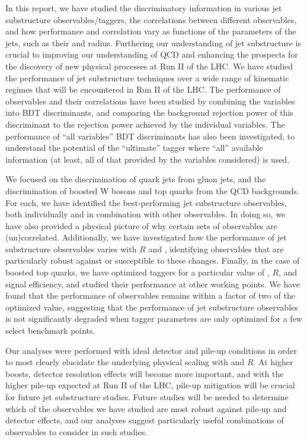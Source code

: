 In this report, we have studied the discriminatory information in various jet substructure observables/taggers, the correlations between different observables, and how performance and correlation vary as functions of the parameters of the jets, such as their \pt and radius. Furthering our understanding of jet substructure is crucial to improving our understanding of QCD and enhancing the prospects for the discovery of new physical processes at Run II of the LHC. We have studied the performance of jet substructure techniques over a wide range of kinematic regimes that will be encountered in Run II of the LHC. The performance of observables and their correlations have been studied by combining the variables into BDT discriminants, and comparing the background rejection power of this discriminant to the rejection power achieved by the individual variables. The performance of ``all variables'' BDT discriminants has also been investigated, to understand the potential of the ``ultimate'' tagger where ``all'' available information (at least, all of that provided by the variables considered) is used.

We focused on the discrimination of quark jets from gluon jets, and the discrimination of boosted W bosons and top quarks from the QCD backgrounds. For each, we have identified the best-performing jet substructure observables, both individually and in combination with other observables. In doing so, we have also provided a physical picture of why certain sets of observables are (un)correlated. Additionally, we have investigated how the performance of jet substructure observables varies with $R$ and \pt, identifying observables that are particularly robust against or susceptible to these changes. Finally, in the case of boosted top quarks, we have optimized taggers for a particular value of \pt, $R$, and signal efficiency, and studied their performance at other working points. We have found that the performance of observables remains within a factor of two of the optimized value, suggesting that the performance of jet substructure observables is not significantly degraded when tagger parameters are only optimized for a few select benchmark points.

Our analyses were performed with ideal detector and pile-up conditions in order to most clearly elucidate the underlying physical scaling with \pt and $R$. At higher boosts, detector resolution effects will become more important, and with the higher pile-up expected at Run II of the LHC, pile-up mitigation will be crucial for future jet substructure studies. Future studies will be needed to determine which of the observables we have studied are most robust against pile-up and detector effects, and our analyses suggest particularly useful combinations of observables to consider in such studies. 

